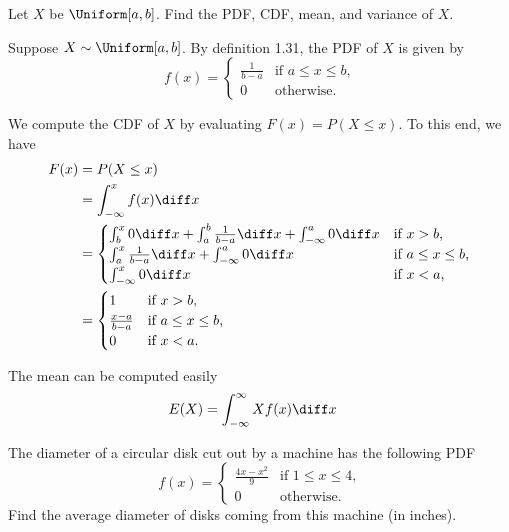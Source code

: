 \begin{problem}[Handout 12, \# 2]
  Let \(X\) be \(\Uniform[a,b]\). Find the PDF, CDF, mean, and variance of
  \(X\).
\end{problem}
\begin{solution}
  Suppose \(X\sim\Uniform[a,b]\). By definition 1.31, the PDF of \(X\) is
  given by
  \[
    f(x)=
    \begin{cases}
      \frac{1}{b-a}&\text{if \(a\leq x\leq b\),}\\
      0&\text{otherwise.}
    \end{cases}
  \]

  We compute the CDF of \(X\) by evaluating \(F(x)=P(X\leq x)\). To this
  end, we have
  \begin{align*}
    F(x)&=P(X\leq x)\\
    &=\int_{-\infty}^x f(x)\diff x\\
    &=
      \begin{cases}
        \int_b^x 0\diff x+\int_a^b\frac{1}{b-a}\diff x+\int_{-\infty}^a
        0\diff x
        &\text{if \(x>b\),}\\
        \int_a^x\frac{1}{b-a}\diff x+\int_{-\infty}^a 0\diff x
        &\text{if \(a\leq x\leq b\),}\\
        \int_{-\infty}^x 0\diff x &\text{if \(x<a\),}
    \end{cases}\\
    &=
      \begin{cases}
        1&\text{if \(x>b\),}\\
        \frac{x-a}{b-a}&\text{if \(a\leq x\leq b\),}\\
        0&\text{if \(x<a\).}
    \end{cases}
  \end{align*}

  The mean can be computed easily
  \begin{align*}
    E(X)
    &=\int_{-\infty}^\infty Xf(x)\diff x
  \end{align*}
\end{solution}
\newpage

\begin{problem}[Handout 12, \# 8]
  The diameter of a circular disk cut out by a machine has the following
  PDF
  \[
    f(x)=\begin{cases}
      \frac{4x-x^2}{9}&\text{if \(1\leq x\leq 4\),}\\
      0&\text{otherwise.}
    \end{cases}
  \]
  Find the average diameter of disks coming from this machine (in inches).
\end{problem}
\begin{solution}

\end{solution}
\newpage

